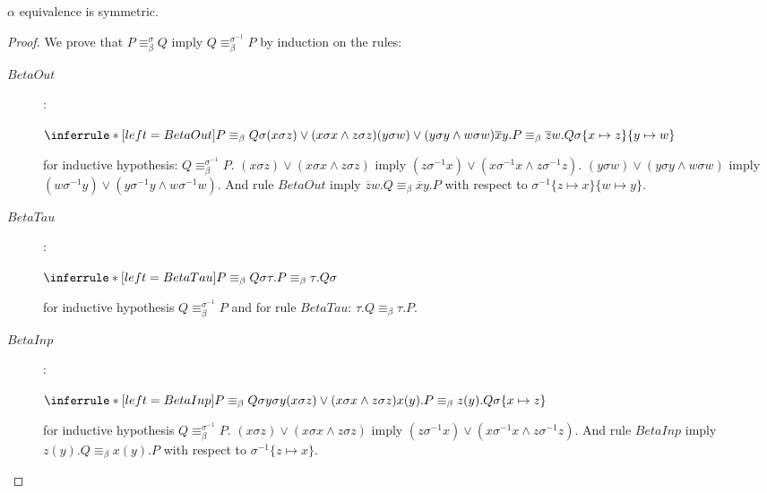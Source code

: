 \begin{lemma}
  $\alpha$ equivalence is symmetric.
  \begin{proof}
    We prove that $P\equiv_{\beta}^{\sigma}Q$ imply $Q\equiv_{\beta}^{\sigma^{-1}}P$ by induction on the rules:
    \begin{description}
      \item[$BetaOut$]:
	\begin{center}
	  $\inferrule*[left=BetaOut]{
	      P\equiv_{\beta}Q
	    \\
	      \sigma
	    \\
	      (x\sigma z) \vee (x\sigma x \wedge z\sigma z)
	    \\
	      (y\sigma w) \vee (y\sigma y \wedge w\sigma w)
	  }{
	      \overline{x}y.P\equiv_{\beta}\overline{z}w.Q
	    \\
	      \sigma \{x\mapsto z\} \{y\mapsto w\}
	  }$
	\end{center}
	for inductive hypothesis: $Q\equiv_{\beta}^{\sigma^{-1}} P$. $(x\sigma z) \vee (x\sigma x \wedge z\sigma z)$ imply $(z\sigma^{-1} x) \vee (x\sigma^{-1} x \wedge z\sigma^{-1} z)$. $(y\sigma w) \vee (y\sigma y \wedge w\sigma w)$ imply $(w\sigma^{-1} y) \vee (y\sigma^{-1} y \wedge w\sigma^{-1} w)$. And rule $BetaOut$ imply $\overline{z}w.Q\equiv_{\beta}\overline{x}y.P$ with respect to $\sigma^{-1} \{z\mapsto x\} \{w\mapsto y\}$.
      \item[$BetaTau$]:
	\begin{center}
	  $\inferrule*[left=BetaTau]{
	      P\equiv_{\beta}Q
	    \\
	      \sigma
	  }{
	      \tau.P\equiv_{\beta}\tau.Q
	    \\
	      \sigma
	  }$
	\end{center}
	for inductive hypothesis $Q\equiv_{\beta}^{\sigma^{-1}}P$ and for rule $BetaTau$: $\tau.Q\equiv_{\beta}\tau.P$.
      \item[$BetaInp$]:
	\begin{center}
	  $\inferrule*[left=BetaInp]{
	      P\equiv_{\beta}Q
	    \\
	      \sigma
	    \\
	      y \sigma y
	    \\
	      (x\sigma z) \vee (x\sigma x \wedge z\sigma z)
	  }{
	      x(y).P\equiv_{\beta}z(y).Q
	    \\
	      \sigma \{x\mapsto z\}
	  }$	  
	\end{center}
	for inductive hypothesis $Q\equiv_{\beta}^{\sigma^{-1}}P$. $(x\sigma z) \vee (x\sigma x \wedge z\sigma z)$ imply $(z\sigma^{-1} x) \vee (x\sigma^{-1} x \wedge z\sigma^{-1} z)$. And rule $BetaInp$ imply $z(y).Q\equiv_{\beta} x(y).P$ with respect to $\sigma^{-1} \{z\mapsto x\}$.

\end{description}
\end{proof}
\end{lemma}
